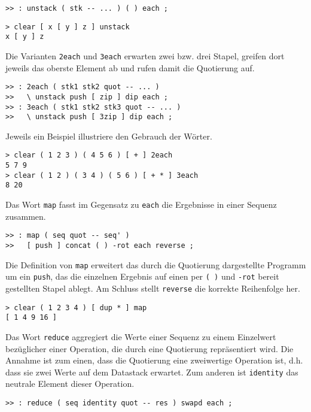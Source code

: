 \begin{verbatim}
>> : unstack ( stk -- ... ) ( ) each ;
\end{verbatim}

\begin{verbatim}
> clear [ x [ y ] z ] unstack
x [ y ] z
\end{verbatim}

Die Varianten \verb|2each| und \verb|3each| erwarten zwei bzw. drei Stapel, greifen dort jeweils das oberste Element ab und rufen damit die Quotierung auf.

\begin{verbatim}
>> : 2each ( stk1 stk2 quot -- ... )
>>   \ unstack push [ zip ] dip each ;
>> : 3each ( stk1 stk2 stk3 quot -- ... )
>>   \ unstack push [ 3zip ] dip each ;
\end{verbatim}

Jeweils ein Beispiel illustriere den Gebrauch der Wörter.

\begin{verbatim}
> clear ( 1 2 3 ) ( 4 5 6 ) [ + ] 2each
5 7 9
> clear ( 1 2 ) ( 3 4 ) ( 5 6 ) [ + * ] 3each
8 20
\end{verbatim}

Das Wort \verb|map| fasst im Gegensatz zu \verb|each| die Ergebnisse in einer Sequenz zusammen.

\begin{verbatim}
>> : map ( seq quot -- seq' )
>>   [ push ] concat ( ) -rot each reverse ;
\end{verbatim}

Die Definition von \verb|map| erweitert das durch die Quotierung dargestellte Programm um ein \verb|push|, das die einzelnen Ergebnis auf einen per \verb|( )| und \verb|-rot| bereit gestellten Stapel ablegt. Am Schluss stellt \verb|reverse| die korrekte Reihenfolge her.

\begin{verbatim}
> clear ( 1 2 3 4 ) [ dup * ] map
[ 1 4 9 16 ]
\end{verbatim}

Das Wort \verb|reduce| aggregiert die Werte einer Sequenz zu einem Einzelwert bezüglicher einer Operation, die durch eine Quotierung repräsentiert wird. Die Annahme ist zum einen, dass die Quotierung eine zweiwertige Operation ist, d.h. dass sie zwei Werte auf dem Datastack erwartet. Zum anderen ist \verb|identity| das neutrale Element dieser Operation.

\begin{verbatim}
>> : reduce ( seq identity quot -- res ) swapd each ;
\end{verbatim}

